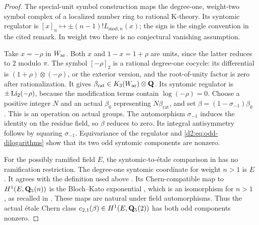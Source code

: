 \begin{proof}
The special-unit symbol construction
\cite[Theorems~1.6 and~1.10, Remark~1.7]{BesserDeJeu}
maps the degree-one, weight-two symbol complex of a localized
number ring to rational K-theory.
Its syntomic regulator is
\([x]_n\mapsto\pm(n-1)!L_{\mathrm{mod},n}(x)\);
the sign is the single convention in the cited remark.
In weight two there is no conjectural vanishing assumption.

Take \(x=-\rho\) in \(W_{\mathrm{ar}}\).
Both \(x\) and \(1-x=1+\rho\) are units, since the latter reduces
to \(2\) modulo \(\pi\).
The symbol \([-\rho]_2\) is a rational degree-one cocycle:
its differential is \((1+\rho)\otimes(-\rho)\), or the exterior
version, and the root-of-unity factor is zero after rationalization.
It gives \(\beta_{\mathrm{rat}}\in K_3(W_{\mathrm{ar}})\otimes\mathbf{Q}\).
Its syntomic regulator is \(\pm\operatorname{Li}_2(-\rho)\), because the
modification terms contain \(\log(-\rho)=0\).
Choose a positive integer \(N\) and an actual \(\beta_0\)
representing \(N\beta_{\mathrm{rat}}\), and set
\(\beta=(1-\sigma_{-1})\beta_0\).
This is an operation on actual groups.
The automorphism \(\sigma_{-1}\) induces the identity on the residue
field, so \(\beta\) reduces to zero.
Its integral antisymmetry follows by squaring \(\sigma_{-1}\).
Equivariance of the regulator and
\eqref{d2:eq:odd-dilogarithms} show that its two odd syntomic
components are nonzero.

For the possibly ramified field \(E\), the syntomic-to-\'etale
comparison in \cite[Section~2]{HuberKings} has no ramification
restriction.
The degree-one syntomic coordinate for weight \(n>1\) is \(E\)
\cite[Example~2.2.4]{HuberKings}.
It agrees with the definition used above
\cite[Proposition~2.2.7]{HuberKings}.
Its Chern-compatible map to \(H^1(E,\mathbf{Q}_5(n))\) is the
Bloch--Kato exponential
\cite[Propositions~2.2.9 and~2.3.4]{HuberKings}, which is an
isomorphism for \(n>1\), as recalled in
\cite[Section~1.3]{HuberKings}.
These maps are natural under field automorphisms.
Thus the actual \'etale Chern class
\(c_{2,1}(\beta)\in H^1(E,\mathbf{Q}_5(2))\) has both odd components
nonzero.


\end{proof}
